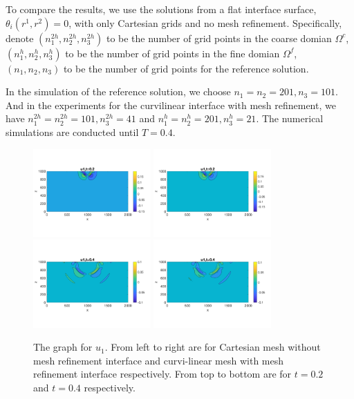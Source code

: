 To compare the results, we use the solutions from a flat interface surface, $\theta_i(r^1,r^2) = 0$, with only Cartesian grids and no mesh refinement. Specifically, denote $(n_1^{2h},n_2^{2h},n_3^{2h})$ to be the number of grid points in the coarse domian $\Omega^c$, $(n_1^h,n_2^h,n_3^h)$ to be the number of grid points in the fine domian $\Omega^f$, $(n_1,n_2,n_3)$ to be the number of grid points for the reference solution.

In the simulation of the reference solution, we choose $n_1 = n_2 = 201, n_3 = 101$. And in the experiments for the curvilinear interface with mesh refinement, we have $n_1^{2h} = n_2^{2h} = 101, n_3^{2h} = 41$ and $n_1^h = n_2^h = 201, n_3^h = 21$. The numerical simulations are conducted until $T = 0.4$.

\begin{figure}[htbp]
	\centering
	\includegraphics[width=0.4\textwidth,trim={0 2.8cm 0 2.8cm}, clip]{u1_t02_cartesian.png}
	\includegraphics[width=0.4\textwidth,trim={0 2.8cm 0 2.8cm}, clip]{u1_t02_curvi_mr.png}\\
	\includegraphics[width=0.4\textwidth,trim={0 2.8cm 0 2.8cm}, clip]{u1_t04_cartesian.png}
	\includegraphics[width=0.4\textwidth,trim={0 2.8cm 0 2.8cm}, clip]{u1_t04_curvi_mr.png}
	\caption{The graph for $u_1$. From left to right are for Cartesian mesh without mesh refinement interface and curvi-linear mesh with mesh refinement interface respectively. From top to bottom are for $t = 0.2$ and $t = 0.4$ respectively.}\label{u1}
\end{figure}


